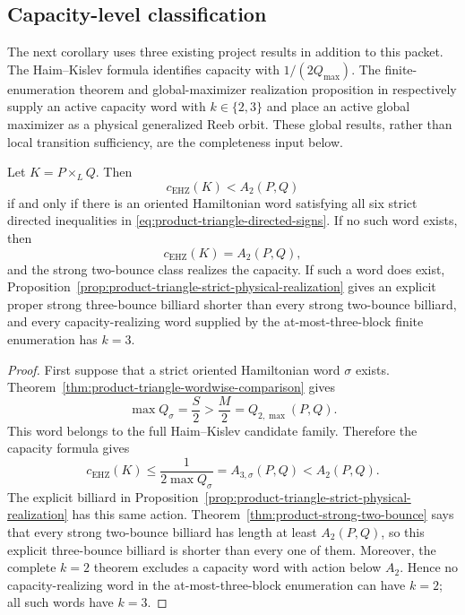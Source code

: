 \subsection{Capacity-level classification}
\label{subsec:product-triangle-capacity-classification}

The next corollary uses three existing project results in addition to this
packet.  The Haim--Kislev formula identifies capacity with
\(1/(2Q_{\max})\).  The finite-enumeration theorem and global-maximizer
realization proposition in
 respectively supply an
active capacity word with \(k\in\{2,3\}\) and place an active global maximizer
as a physical generalized Reeb orbit.  These global results, rather than
local transition sufficiency, are the completeness input below.

\begin{unverified}
\begin{corollary}
\label{cor:product-triangle-capacity-classification}
Let \(K=P\times_LQ\).  Then
\[
 c_{\mathrm{EHZ}}(K)<A_2(P,Q)
\]
if and only if there is an oriented Hamiltonian word satisfying all six
strict directed inequalities in
\eqref{eq:product-triangle-directed-signs}.  If no such word exists, then
\[
 c_{\mathrm{EHZ}}(K)=A_2(P,Q),
\]
and the strong two-bounce class realizes the capacity.  If such a word does
exist, Proposition~\ref{prop:product-triangle-strict-physical-realization}
gives an explicit proper strong three-bounce billiard shorter than every
strong two-bounce billiard, and every capacity-realizing word supplied by the
at-most-three-block finite enumeration has \(k=3\).
\end{corollary}

\begin{proof}
First suppose that a strict oriented Hamiltonian word \(\sigma\) exists.
Theorem~\ref{thm:product-triangle-wordwise-comparison} gives
\[
 \max Q_\sigma=\frac S2>\frac M2=Q_{2,\max}(P,Q).
\]
This word belongs to the full Haim--Kislev candidate family.  Therefore the
capacity formula gives
\[
 c_{\mathrm{EHZ}}(K)
 \leq\frac1{2\max Q_\sigma}
 =A_{3,\sigma}(P,Q)<A_2(P,Q).
\]
The explicit billiard in
Proposition~\ref{prop:product-triangle-strict-physical-realization} has this
same action.  Theorem~\ref{thm:product-strong-two-bounce} says that every
strong two-bounce billiard has length at least \(A_2(P,Q)\), so this explicit
three-bounce billiard is shorter than every one of them.  Moreover, the
complete \(k=2\) theorem excludes a capacity word with action below \(A_2\).
Hence no capacity-realizing word in the at-most-three-block enumeration can
have \(k=2\); all such words have \(k=3\).


\end{proof}
\end{unverified}
